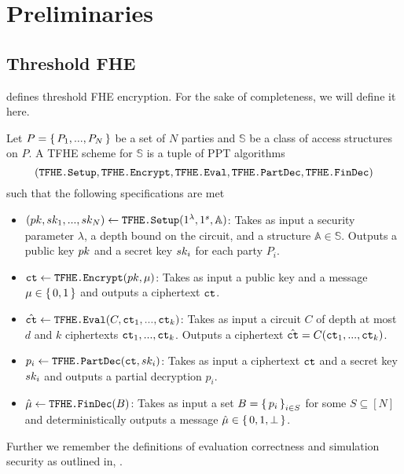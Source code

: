 \section{Preliminaries}
\subsection{Threshold FHE}
\cite{jain2017threshold,boneh2018threshold} defines threshold FHE encryption. For the sake of completeness, we will define it here.

\begin{definition}
	Let $P = \set{P_1, ..., P_N}$	 be a set of $N$ parties and $\mathbb{S}$ be a class of
	access structures on $P$. A TFHE scheme for $\mathbb{S}$ is a tuple of PPT algorithms
	$$
		(\texttt{TFHE.Setup}, \texttt{TFHE.Encrypt}, \texttt{TFHE.Eval}, \texttt{TFHE.PartDec}, \texttt{TFHE.FinDec})
	$$ such that the following specifications are met

	\begin{itemize}
		\item $(pk, sk_1, ..., sk_N) \gets \texttt{TFHE.Setup}(1^\lambda, 1^s, \mathbb{A})$:
		      Takes as input a security parameter $\lambda$, a depth bound on the circuit, and a structure $\mathbb{A} \in \mathbb{S}$.
		      Outputs a public key $pk$ and a secret key $sk_i$ for each party $P_i$.
		\item $\texttt{ct} \gets \texttt{TFHE.Encrypt}(pk, \mu)$: Takes as input a public key and a message $\mu \in \set{0, 1}$ and outputs a ciphertext $\texttt{ct}$.
		\item $\hat{\texttt{ct}} \gets \texttt{TFHE.Eval}(C, \texttt{ct}_1, ..., \texttt{ct}_k)$: Takes as input a circuit $C$ of depth at most $d$ and $k$ ciphertexts $\texttt{ct}_1, ..., \texttt{ct}_k$.
		      Outputs a ciphertext $\hat{\texttt{ct}} = C(\texttt{ct}_1, ..., \texttt{ct}_k)$.
		\item $p_i \gets \texttt{TFHE.PartDec}(\texttt{ct}, sk_i)$: Takes as input a ciphertext $\texttt{ct}$ and a secret key $sk_i$ and outputs a partial decryption $p_i$.
		\item $\hat\mu \gets \texttt{TFHE.FinDec}(B)$: Takes as input a set $B = \set{p_i}_{i \in S}$ for some $S \subseteq [N]$ and deterministically
		      outputs a message $\hat\mu \in \set{0, 1, \bot}$.
	\end{itemize}
\end{definition}

Further we remember the definitions of evaluation correctness and simulation security as outlined in,
\cite{boneh2020single}.

